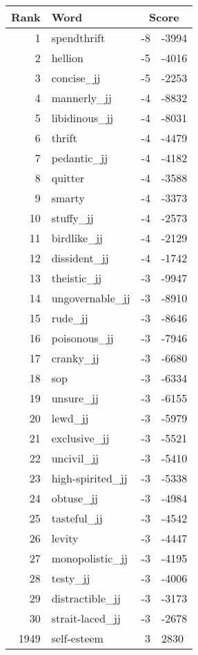\begin{longtable}[!htbp]{| rlr@{.}l |}
    \hline
    \textbf{Rank} & \textbf{Word} & \multicolumn{2}{c|}{\textbf{Score}} \\
    \hline
    \endhead
    1 & spendthrift & -8 & -3994 \\
    2 & hellion & -5 & -4016 \\
    3 & concise\_jj & -5 & -2253 \\
    4 & mannerly\_jj & -4 & -8832 \\
    5 & libidinous\_jj & -4 & -8031 \\
    6 & thrift & -4 & -4479 \\
    7 & pedantic\_jj & -4 & -4182 \\
    8 & quitter & -4 & -3588 \\
    9 & smarty & -4 & -3373 \\
    10 & stuffy\_jj & -4 & -2573 \\
    11 & birdlike\_jj & -4 & -2129 \\
    12 & dissident\_jj & -4 & -1742 \\
    13 & theistic\_jj & -3 & -9947 \\
    14 & ungovernable\_jj & -3 & -8910 \\
    15 & rude\_jj & -3 & -8646 \\
    16 & poisonous\_jj & -3 & -7946 \\
    17 & cranky\_jj & -3 & -6680 \\
    18 & sop & -3 & -6334 \\
    19 & unsure\_jj & -3 & -6155 \\
    20 & lewd\_jj & -3 & -5979 \\
    21 & exclusive\_jj & -3 & -5521 \\
    22 & uncivil\_jj & -3 & -5410 \\
    23 & high-spirited\_jj & -3 & -5338 \\
    24 & obtuse\_jj & -3 & -4984 \\
    25 & tasteful\_jj & -3 & -4542 \\
    26 & levity & -3 & -4447 \\
    27 & monopolistic\_jj & -3 & -4195 \\
    28 & testy\_jj & -3 & -4006 \\
    29 & distractible\_jj & -3 & -3173 \\
    30 & strait-laced\_jj & -3 & -2678 \\
    1949 & self-esteem & 3 & 2830 \\

\end{longtable}
